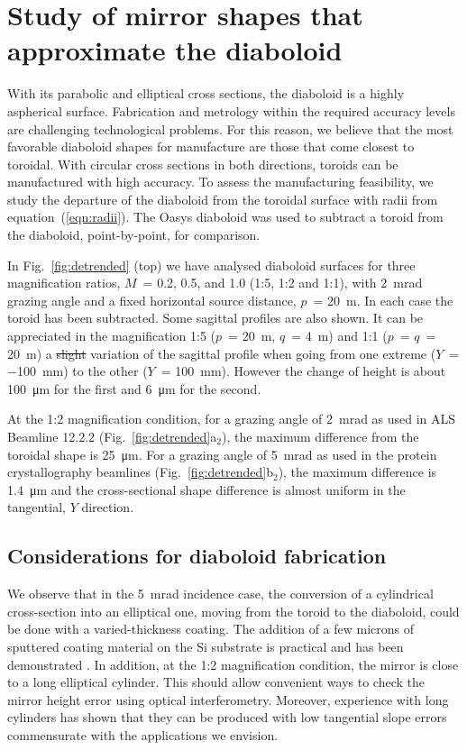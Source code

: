 \documentclass[preprint]{iucr}       %
\newcommand{\inred}[1]{{\color{red}#1}}
\begin{document}
\section{Study of mirror shapes that approximate the diaboloid}
\label{sec:approximatedShapes}

With its parabolic and elliptical cross sections, the diaboloid is a highly aspherical surface. Fabrication and metrology within the required accuracy levels are challenging technological problems. For this reason, we believe that the most favorable diaboloid shapes for manufacture are those that come closest to toroidal. With circular cross sections in both directions, toroids can be manufactured with high accuracy. To assess the manufacturing feasibility, we study the departure of the diaboloid from the toroidal surface with radii from equation~(\ref{eqn:radii}). The Oasys diaboloid was used to subtract a toroid from the diaboloid, point-by-point, for comparison.

In Fig.~\ref{fig:detrended} \inred{(top)} we have analysed diaboloid surfaces for three magnification ratios, $M$~= 0.2, 0.5, and 1.0 (1:5, 1:2 and 1:1), with \SI{2}{\milli\radian} grazing angle and a fixed \inred{horizontal} source distance, $p$~= \SI{20}{\meter}. In each case the toroid has been subtracted. Some sagittal profiles are also shown. It can be appreciated in the magnification 1:5 ($p$~= \SI{20}{\meter}, $q$~= \SI{4}{\meter}) and 1:1 ($p$~= $q$~= \SI{20}{\meter}) a \inred{\sout{slight}} variation of the sagittal profile when going from one extreme ($Y$~= \SI{-100}{\milli\meter}) to the other ($Y$~= \SI{100}{\milli\meter}). However the change of height is about \SI{100}{\micro\meter} for the first and \SI{6}{\micro\meter} for the second. 

At the 1:2 magnification condition, for a grazing angle of \SI{2}{\milli\radian} as used in ALS Beamline 12.2.2 (Fig.~\ref{fig:detrended}a\inred{$_2$}), the maximum difference from the toroidal shape is \SI{25}{\micro\meter}. For a grazing angle of \SI{5}{\milli\radian} as used in the protein crystallography beamlines (Fig.~\ref{fig:detrended}b\inred{$_2$}), the maximum difference is \SI{1.4}{\micro\meter} and the cross-sectional shape difference is almost uniform in the tangential, $Y$ direction.

\subsection{Considerations for diaboloid fabrication}
We observe that in the \SI{5}{\milli\radian} incidence case, the conversion of a cylindrical cross-section into an elliptical one, moving from the toroid to the diaboloid, could be done with a varied-thickness coating. The addition of a few microns of sputtered coating material
on the Si substrate is practical and has been demonstrated \cite{Morawe}. In addition, at the 1:2 magnification condition, the mirror is close to a long elliptical cylinder. This should allow convenient ways to check the mirror height error using optical interferometry. Moreover, experience with long cylinders has shown that they can be produced with low tangential slope errors commensurate with the applications we envision. 
\end{document}
